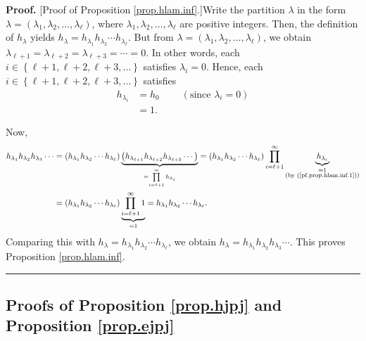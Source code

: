 \documentclass[numbers=enddot,12pt,final,onecolumn,notitlepage]{scrartcl}%
\theoremstyle{definition}
\newenvironment{proof}[1][Proof]{\noindent\textbf{#1.} }{\ \rule{0.5em}{0.5em}}
\let\prodnonlimits\prod
\renewcommand{\prod}{\prodnonlimits\limits}
\newenvironment{verlong}{}{}
\begin{document}
\begin{verlong}
\begin{proof}
[Proof of Proposition \ref{prop.hlam.inf}.]Write the partition $\lambda$ in
the form $\lambda=\left(  \lambda_{1},\lambda_{2},\ldots,\lambda_{\ell
}\right)  $, where $\lambda_{1},\lambda_{2},\ldots,\lambda_{\ell}$ are
positive integers. Then, the definition of $h_{\lambda}$ yields $h_{\lambda
}=h_{\lambda_{1}}h_{\lambda_{2}}\cdots h_{\lambda_{\ell}}$. But from
$\lambda=\left(  \lambda_{1},\lambda_{2},\ldots,\lambda_{\ell}\right)  $, we
obtain $\lambda_{\ell+1}=\lambda_{\ell+2}=\lambda_{\ell+3}=\cdots=0$. In other
words, each $i\in\left\{  \ell+1,\ell+2,\ell+3,\ldots\right\}  $ satisfies
$\lambda_{i}=0$. Hence, each $i\in\left\{  \ell+1,\ell+2,\ell+3,\ldots
\right\}  $ satisfies
\begin{align}
h_{\lambda_{i}}  &  =h_{0}\ \ \ \ \ \ \ \ \ \ \left(  \text{since }\lambda
_{i}=0\right) \nonumber\\
&  =1. \label{pf.prop.hlam.inf.1}%
\end{align}


Now,
\begin{align*}
h_{\lambda_{1}}h_{\lambda_{2}}h_{\lambda_{3}}\cdots &  =\left(  h_{\lambda
_{1}}h_{\lambda_{2}}\cdots h_{\lambda_{\ell}}\right)  \underbrace{\left(
h_{\lambda_{\ell+1}}h_{\lambda_{\ell+2}}h_{\lambda_{\ell+3}}\cdots\right)
}_{=\prod_{i=\ell+1}^{\infty}h_{\lambda_{i}}}=\left(  h_{\lambda_{1}%
}h_{\lambda_{2}}\cdots h_{\lambda_{\ell}}\right)  \prod_{i=\ell+1}^{\infty
}\underbrace{h_{\lambda_{i}}}_{\substack{=1\\\text{(by
(\ref{pf.prop.hlam.inf.1}))}}}\\
&  =\left(  h_{\lambda_{1}}h_{\lambda_{2}}\cdots h_{\lambda_{\ell}}\right)
\underbrace{\prod_{i=\ell+1}^{\infty}1}_{=1}=h_{\lambda_{1}}h_{\lambda_{2}%
}\cdots h_{\lambda_{\ell}}.
\end{align*}
Comparing this with $h_{\lambda}=h_{\lambda_{1}}h_{\lambda_{2}}\cdots
h_{\lambda_{\ell}}$, we obtain $h_{\lambda}=h_{\lambda_{1}}h_{\lambda_{2}%
}h_{\lambda_{3}}\cdots$. This proves Proposition \ref{prop.hlam.inf}.
\end{proof}
\end{verlong}

\subsection{\label{subsect.proofs.ejpj}Proofs of Proposition \ref{prop.hjpj}
and Proposition \ref{prop.ejpj}}
\end{document}
